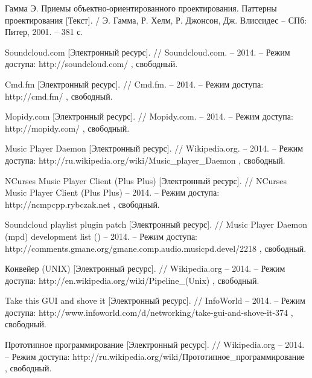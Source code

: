 \begingroup 
\renewcommand{\section}[2]{\anonsection{Список использованных источников}}
\begin{thebibliography}{00}
  
  Гамма Э.
  Приемы объектно-ориентированного проектирования. Паттерны
  проектирования [Текст]. / 
  Э. Гамма, Р. Хелм, Р. Джонсон, Дж. Влиссидес --
  СПб: Питер, 2001. -- 381 с. 

  Soundcloud.com
  [Электронный ресурс]. // 
  Soundcloud.com. 
  -- 2014. -- Режим доступа:
  http://soundcloud.com/ 
  , свободный.

  Cmd.fm
  [Электронный ресурс]. // 
  Cmd.fm. 
  -- 2014. -- Режим доступа:
  http://cmd.fm/ 
  , свободный.

 Mopidy.com
  [Электронный ресурс]. // 
  Mopidy.com. 
  -- 2014. -- Режим доступа:
  http://mopidy.com/ 
  , свободный.

  Music Player Daemon
  [Электронный ресурс]. // 
  Wikipedia.org. 
  -- 2014. -- Режим доступа:
  http://ru.wikipedia.org/wiki/Music\_player\_Daemon 
  , свободный.

  NCurses Music Player Client (Plus Plus)
  [Электронный ресурс]. // 
  NCurses Music Player Client (Plus Plus)
  -- 2014. -- Режим доступа:
  http://ncmpcpp.rybczak.net
  , свободный.

  Soundcloud playlist plugin patch
  [Электронный ресурс]. // 
  Music Player Daemon (mpd) development list () 
  -- 2014. -- Режим доступа:
  http://comments.gmane.org/gmane.comp.audio.musicpd.devel/2218
  , свободный.

  Конвейер (UNIX)   
  [Электронный ресурс]. //
  Wikipedia.org
  -- 2014. -- Режим доступа:
  http://en.wikipedia.org/wiki/Pipeline\_(Unix) 
  , свободный.

  Take this GUI and shove it
  [Электронный ресурс]. //
  InfoWorld
  -- 2014. -- Режим доступа:
  http://www.infoworld.com/d/networking/take-gui-and-shove-it-374
  , свободный.

  Прототипное программирование
  [Электронный ресурс]. //
  Wikipedia.org
  -- 2014. -- Режим доступа:
  http://ru.wikipedia.org/wiki/Прототипное\_программирование
  , свободный.


\end{thebibliography}
